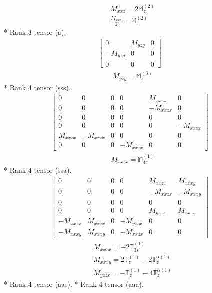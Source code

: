 \documentclass[fleqn,8pt,landscape]{jsarticle}
\begin{document}
\begin{align*}
& M_{xxz} = 2 \mathbb{M}_{z}^{(2)} \\
& \frac{M_{xxz}}{2} = \mathbb{M}_{z}^{(2)}
\end{align*}
* Rank 3 tensor (a).
\begin{align*}
\begin{bmatrix} 0 & M_{yzy} & 0 \\ - M_{yzy} & 0 & 0 \\ 0 & 0 & 0 \end{bmatrix}
\end{align*}
\begin{align*}
& M_{yzy} = \mathbb{M}_{z}^{(3)}
\end{align*}
* Rank 4 tensor (sss).
\begin{align*}
\begin{bmatrix} 0 & 0 & 0 & 0 & M_{xxzx} & 0 \\ 0 & 0 & 0 & 0 & - M_{xxzx} & 0 \\ 0 & 0 & 0 & 0 & 0 & 0 \\ 0 & 0 & 0 & 0 & 0 & - M_{xxzx} \\ M_{xxzx} & - M_{xxzx} & 0 & 0 & 0 & 0 \\ 0 & 0 & 0 & - M_{xxzx} & 0 & 0 \end{bmatrix}
\end{align*}
\begin{align*}
& M_{xxzx} = \mathbb{M}_{4c}^{(1)}
\end{align*}
* Rank 4 tensor (ssa).
\begin{align*}
\begin{bmatrix} 0 & 0 & 0 & 0 & M_{xxzx} & M_{xxxy} \\ 0 & 0 & 0 & 0 & - M_{xxzx} & - M_{xxxy} \\ 0 & 0 & 0 & 0 & 0 & 0 \\ 0 & 0 & 0 & 0 & M_{yzzx} & M_{xxzx} \\ - M_{xxzx} & M_{xxzx} & 0 & - M_{yzzx} & 0 & 0 \\ - M_{xxxy} & M_{xxxy} & 0 & - M_{xxzx} & 0 & 0 \end{bmatrix}
\end{align*}
\begin{align*}
& M_{xxzx} = - 2 \mathbb{T}_{3s}^{(1)} \\
& M_{xxxy} = 2 \mathbb{T}_{z}^{(1)} - 2 \mathbb{T}_{z}^{\alpha(1)} \\
& M_{yzzx} = - \mathbb{T}_{z}^{(1)} - 4 \mathbb{T}_{z}^{\alpha(1)}
\end{align*}
* Rank 4 tensor (aas).
* Rank 4 tensor (aaa).
\end{document}
